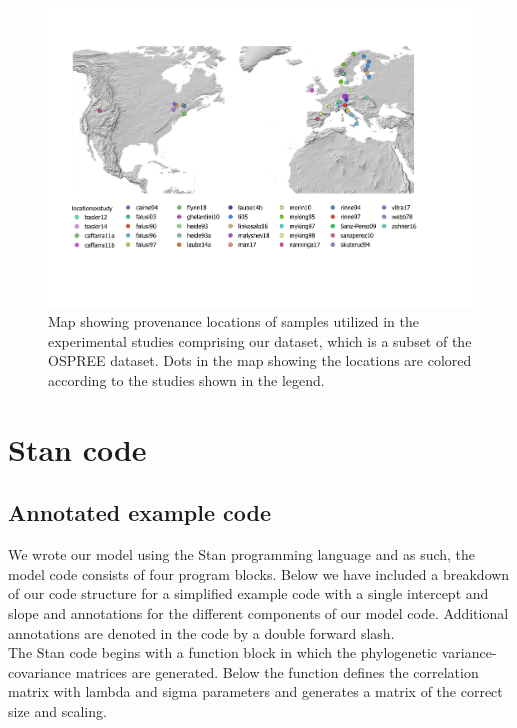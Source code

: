 \documentclass[11pt]{article}
\begin{document}
\clearpage
\begin{figure}
  \begin{center}
  \includegraphics[width=14cm]{../../analyses/phylogeny/figures/FigSXXXX_map_study_locations_legend.pdf}
  \caption{Map showing provenance locations of samples utilized in the experimental studies comprising our dataset, which is a subset of the OSPREE dataset. Dots in the map showing the locations are colored according to the studies shown in the legend.}
  \label{fig:mapstudylocations}
  \end{center}
\end{figure}



\clearpage
\section*{Stan code}

\subsection*{Annotated example code}
We wrote our model using the Stan programming language and as such, the model code consists of four program blocks. Below we have included a breakdown of our code structure for a simplified example code with a single intercept and slope and annotations for the different components of our model code. Additional annotations are denoted in the code by a double forward slash.\\

The Stan code begins with a function block in which the phylogenetic variance-covariance matrices are generated. Below the function defines the correlation matrix with lambda and sigma parameters and generates a matrix of the correct size and scaling.\\
\end{document}
